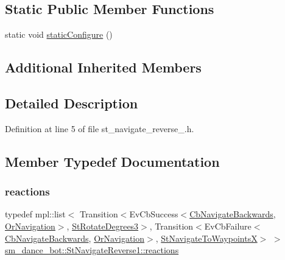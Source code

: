 \subsection*{Static Public Member Functions}
\begin{DoxyCompactItemize}
\item 
static void \hyperlink{structsm__dance__bot_1_1StNavigateReverse1_a27ad6ec4e54e4b4acc676fdb3948849e}{static\+Configure} ()
\end{DoxyCompactItemize}
\subsection*{Additional Inherited Members}


\subsection{Detailed Description}


Definition at line 5 of file st\+\_\+navigate\+\_\+reverse\+\_.\+h.



\subsection{Member Typedef Documentation}
\mbox{\label{structsm__dance__bot_1_1StNavigateReverse1_a24a5443646b3a4d633743a4670945f3b}} 
\subsubsection{\texorpdfstring{reactions}{reactions}}
{\footnotesize\ttfamily typedef mpl\+::list$<$ Transition$<$Ev\+Cb\+Success$<$\hyperlink{classcl__move__base__z_1_1CbNavigateBackwards}{Cb\+Navigate\+Backwards}, \hyperlink{classsm__dance__bot_1_1OrNavigation}{Or\+Navigation}$>$, \hyperlink{structsm__dance__bot_1_1StRotateDegrees3}{St\+Rotate\+Degrees3}$>$, Transition$<$Ev\+Cb\+Failure$<$\hyperlink{classcl__move__base__z_1_1CbNavigateBackwards}{Cb\+Navigate\+Backwards}, \hyperlink{classsm__dance__bot_1_1OrNavigation}{Or\+Navigation}$>$, \hyperlink{structsm__dance__bot_1_1StNavigateToWaypointsX}{St\+Navigate\+To\+WaypointsX}$>$ $>$ \hyperlink{structsm__dance__bot_1_1StNavigateReverse1_a24a5443646b3a4d633743a4670945f3b}{sm\+\_\+dance\+\_\+bot\+::\+St\+Navigate\+Reverse1\+::reactions}}



